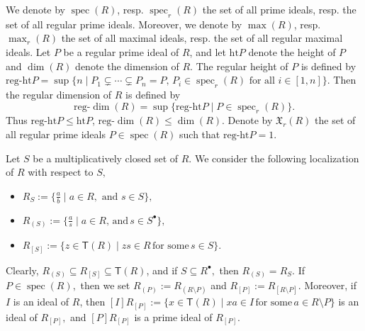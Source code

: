 \documentclass[a4paper, 10pt]{amsart}
\newcommand{\defit}[1]{{\textsf{#1}}}
\theoremstyle{plain}
\theoremstyle{definition}
\theoremstyle{remark}
\DeclareMathOperator{\spec}{spec}
\numberwithin{equation}{section}
\begin{document}
We denote by $\spec(R)$, resp. $\spec_r(R)$ the set of all prime ideals, resp. the set of all regular prime ideals. Moreover, we denote by $\max(R)$, resp. $\max_r(R)$ the set of all maximal ideals, resp. the set of all regular maximal ideals.  
Let $P$ be a regular prime ideal of $R$, and let $\mathrm{ht}P$ denote the \defit{height} of $P$ and $\dim (R)$ denote the dimension of $R$. The \defit{regular height} of $P$ is defined by $\mathrm{reg}$-$\mathrm{ht} P=\sup \{n\mid P_1\subsetneq\cdots\subsetneq P_n=P,\, P_i\in \spec_r(R) \text{ for all $i \in [1, n]$}\}.$ Then the \defit{regular dimension} of $R$ is defined by \[\mathrm{reg}\text{-}\dim(R)=\sup\{\mathrm{reg}\text{-}\mathrm{ht} P\mid P\in \spec_r(R)\}. \] Thus $\mathrm{reg}$-$\mathrm{ht} P \le \mathrm{ht}P$, $\mathrm{reg}$-$\dim(R)\le \dim (R)$. Denote by $\mathfrak{X}_r(R)$ the set of all regular prime ideals $P\in \spec(R)$ such that $\mathrm{reg}$-$\mathrm{ht}P=1$.

Let $S$ be a multiplicatively closed set of $R$. We consider the following localization of $R$ with respect to $S,$ \begin{itemize}
    \item $R_S:=\{\frac{a}{b}\mid a\in R,\text{ and } s\in S \},$
    \item $R_{(S)}:=\{\frac{a}{s}\mid a\in R, \, \text{and} \, s\in S^\bullet\},$
    \item $R_{[S]}:=\{z\in \mathsf T(R)\mid zs\in R\, \text{for some} \, s\in S\}.$ 
\end{itemize}
Clearly, $R_{(S)}\subseteq R_{[S]}\subseteq \mathsf T(R)$, and if $S\subseteq R^\bullet,$ then $R_{(S)}= R_{S}$. If $P\in \spec (R),$ then we set $R_{(P)}:=R_{(R\setminus P)}$ and $R_{[P]}:=R_{[R\setminus P]}.$ Moreover, if $I$ is an ideal of $R$, then $[I]R_{[P]}:=\{x\in \mathsf T(R)\mid xa\in I\, \text{for some} \, a\in R\setminus P\}$ is an ideal of $R_{[P]},$ and $[P]R_{[P]}$ is a prime ideal of $R_{[P]}.$
 
\end{document}
